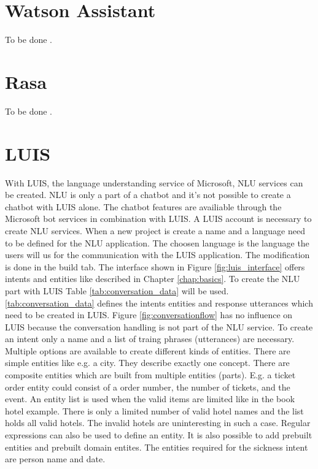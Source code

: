 \section{Watson Assistant}
To be done \cite{watsonassistant}.
 
\section{Rasa}
To be done \cite{rasa}.

\section{LUIS}
With LUIS\cite{luisdocs}, the language understanding service of Microsoft,
NLU services can be created.
NLU is only a part of a chatbot and it's not possible 
to create a chatbot with LUIS alone.
The chatbot features are availiable through the Microsoft bot services 
in combination with LUIS.
A LUIS account is necessary to create NLU services.
When a new project is create a name and a language need to be defined for 
the NLU application.
The choosen language is the language the users will us for the communication with the 
LUIS application.
The modification is done in the build tab.
The interface shown in Figure \ref{fig:luis_interface} offers intents and entities
like described in Chapter \ref{chap:basics}.
To create the NLU part with LUIS Table \ref{tab:conversation_data} will be used.
\ref{tab:conversation_data} defines the intents entities and response utterances
which need to be created in LUIS.
Figure \ref{fig:conversationflow} has no influence on LUIS because the 
conversation handling is not part of the NLU service.
To create an intent only a name and a list of traing phrases (utterances) are necessary.
Multiple options are available to create different kinds of entities.
There are simple entities like e.g. a city.
They describe exactly one concept.
There are composite entities which are built from multiple entities (parts).
E.g. a ticket order entity could consist of a order number, the number of 
tickets, and the event.
An entity list is used when the valid items are limited like in the book hotel example.
There is only a limited number of valid hotel names and the list holds all valid 
hotels.
The invalid hotels are uninteresting in such a case.
Regular expressions\cite{regex} can also be used to define an entity.
It is also possible to add prebuilt entities and prebuilt domain entites.
The entities required for the sickness intent are person name and date. 

